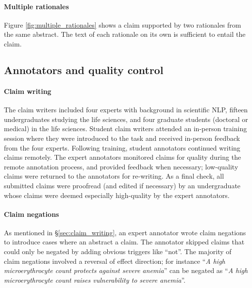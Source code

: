 

\paragraph{Multiple rationales} Figure \ref{fig:multiple_rationales} shows a claim supported by two rationales from the same abstract. The text of each rationale on its own is sufficient to entail the claim.





\subsection{Annotators and quality control}

\paragraph{Claim writing} The claim writers included four experts with background in scientific NLP, fifteen undergraduates studying the life sciences, and four graduate students (doctoral or medical) in the life sciences. Student claim writers attended an in-person training session where they were introduced to the task and received in-person feedback from the four experts. Following training, student annotators continued writing claims remotely. The expert annotators monitored claims for quality during the remote annotation process, and provided feedback when necessary; low-quality claims were returned to the annotators for re-writing. As a final check, all submitted claims were proofread (and edited if necessary) by an undergraduate whose claims were deemed especially high-quality by the expert annotators.

\paragraph{Claim negations}

As mentioned in \S\ref{sec:claim_writing}, an expert annotator wrote claim negations to introduce cases where an abstract  a claim. The annotator skipped claims that could only be negated by adding obvious triggers like ``not''. The majority of claim negations involved a reversal of effect direction; for instance ``\emph{A high microerythrocyte count protects against severe anemia}'' can be negated as ``\emph{A high microerythrocyte count raises vulnerability to severe anemia}''.

